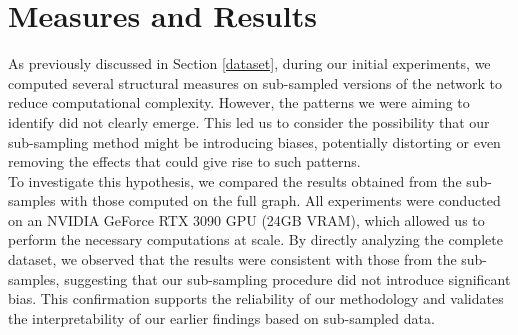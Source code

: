 \documentclass[12pt, a4paper]{article}
\begin{document}
\section{Measures and Results} \label{measures}
	As previously discussed in Section \ref{dataset}, during our initial experiments, we computed several structural measures on sub-sampled versions of the network to reduce computational complexity. However, the patterns we were aiming to identify did not clearly emerge. This led us to consider the possibility that our sub-sampling method might be introducing biases, potentially distorting or even removing the effects that could give rise to such patterns.\\
	To investigate this hypothesis, we compared the results obtained from the sub-samples with those computed on the full graph. All experiments were conducted on an NVIDIA GeForce RTX 3090 GPU (24GB VRAM), which allowed us to perform the necessary computations at scale. By directly analyzing the complete dataset, we observed that the results were consistent with those from the sub-samples, suggesting that our sub-sampling procedure did not introduce significant bias. This confirmation supports the reliability of our methodology and validates the interpretability of our earlier findings based on sub-sampled data.
\end{document}

